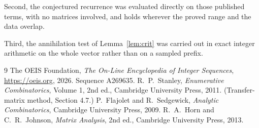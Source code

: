 \documentclass[11pt,a4paper]{article}
\theoremstyle{plain}
\theoremstyle{definition}
\begin{document}
Second, the conjectured recurrence was evaluated directly on those published terms, with no
matrices involved, and holds wherever the proved range and the data overlap.

Third, the annihilation test of Lemma~\ref{lem:crit} was carried out in exact integer
arithmetic on the whole vector rather than on a sampled prefix.

\begin{thebibliography}{9}
 The OEIS Foundation, \emph{The On-Line Encyclopedia of Integer
Sequences}, \url{https://oeis.org}, 2026. Sequence A269635.
 R.~P.~Stanley, \emph{Enumerative Combinatorics}, Volume 1, 2nd ed.,
Cambridge University Press, 2011. (Transfer-matrix method, Section 4.7.)
 P.~Flajolet and R.~Sedgewick, \emph{Analytic Combinatorics}, Cambridge
University Press, 2009.
 R.~A.~Horn and C.~R.~Johnson, \emph{Matrix Analysis}, 2nd ed., Cambridge
University Press, 2013.
\end{thebibliography}
\end{document}
